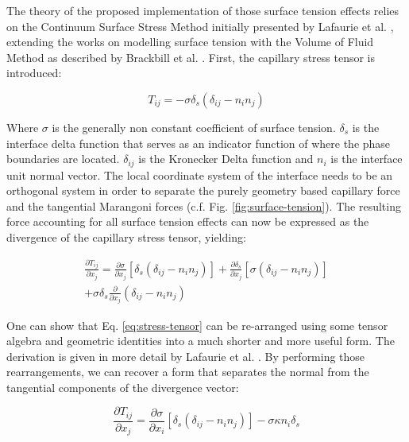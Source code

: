 \documentclass[conference,final,a4paper]{IEEEtran}
\begin{document}
The theory of the proposed implementation of those surface tension effects relies on the Continuum Surface Stress Method initially presented by Lafaurie et al. \cite{lafaurieModellingMergingFragmentation1994}, extending the works on modelling surface tension with the Volume of Fluid Method as described by Brackbill et al. \cite{brackbillContinuumMethodModeling1992}.
 First, the capillary stress tensor is introduced:

\begin{equation}
    T_{ij} = - \sigma \delta_s (\delta_{ij} - n_i n_j)
\end{equation}

Where $\sigma$ is the generally non constant coefficient of surface tension. $\delta_s$ is the interface delta function that serves as an indicator function of where the phase boundaries are located. $\delta_{ij}$ is the Kronecker Delta function and $n_i$ is the interface unit normal vector. The local coordinate system of the interface needs to be an orthogonal system in order to separate the purely geometry based capillary force and the tangential Marangoni forces (c.f. Fig. \ref{fig:surface-tension}).
The resulting force accounting for all surface tension effects can now be expressed as the divergence of the capillary stress tensor, yielding:

\begin{multline} \label{eq:stress-tensor}
    \frac{\partial T_{ij}}{\partial x_j} = \frac{\partial \sigma}{\partial x_j} [\delta_s(\delta_{ij} - n_i n_j)] + \frac{\partial \delta_s}{\partial x_j} [\sigma (\delta_{ij} - n_i n_j)] \\ + \sigma \delta_s \frac{\partial}{\partial x_j} (\delta_{ij} - n_i n_j)
\end{multline}

One can show that Eq. \ref{eq:stress-tensor} can be re-arranged using some tensor algebra and geometric identities into a much shorter and more useful form. The derivation is given in more detail by Lafaurie et al. \cite{lafaurieModellingMergingFragmentation1994}. By performing those rearrangements, we can recover a form that separates the normal from the tangential components of the divergence vector:

\begin{equation}
\label{eq:divergence-capillarystress}
    \frac{\partial T_{ij}}{\partial x_j} = \frac{\partial \sigma}{\partial x_i} [\delta_s(\delta_{ij} - n_i n_j)] - \sigma \kappa n_i \delta_s 
\end{equation}
\end{document}
